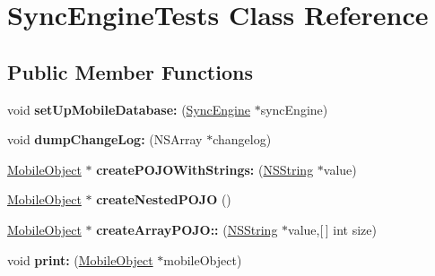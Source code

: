 \hypertarget{interface_sync_engine_tests}{
\section{\-Sync\-Engine\-Tests \-Class \-Reference}
\label{interface_sync_engine_tests}
}
\subsection*{\-Public \-Member \-Functions}
\begin{DoxyCompactItemize}
\item 
\hypertarget{interface_sync_engine_tests_a51a5682df4dec3f02eb3eabaa6e81407}{
void {\bfseries set\-Up\-Mobile\-Database\-:} (\hyperlink{interface_sync_engine}{\-Sync\-Engine} $\ast$sync\-Engine)}
\label{interface_sync_engine_tests_a51a5682df4dec3f02eb3eabaa6e81407}

\item 
\hypertarget{interface_sync_engine_tests_a8237074344a84665f875142288823625}{
void {\bfseries dump\-Change\-Log\-:} (\-N\-S\-Array $\ast$changelog)}
\label{interface_sync_engine_tests_a8237074344a84665f875142288823625}

\item 
\hypertarget{interface_sync_engine_tests_a9e7bb5e016f74b84d45363a75da700d4}{
\hyperlink{interface_mobile_object}{\-Mobile\-Object} $\ast$ {\bfseries create\-P\-O\-J\-O\-With\-Strings\-:} (\hyperlink{class_n_s_string}{\-N\-S\-String} $\ast$value)}
\label{interface_sync_engine_tests_a9e7bb5e016f74b84d45363a75da700d4}

\item 
\hypertarget{interface_sync_engine_tests_addbea0a3f9285bea1e6d1fa3bae38564}{
\hyperlink{interface_mobile_object}{\-Mobile\-Object} $\ast$ {\bfseries create\-Nested\-P\-O\-J\-O} ()}
\label{interface_sync_engine_tests_addbea0a3f9285bea1e6d1fa3bae38564}

\item 
\hypertarget{interface_sync_engine_tests_acd5e4643a66dc9bdbc63f0fde8d03ee1}{
\hyperlink{interface_mobile_object}{\-Mobile\-Object} $\ast$ {\bfseries create\-Array\-P\-O\-J\-O\-::} (\hyperlink{class_n_s_string}{\-N\-S\-String} $\ast$value,\mbox{[}$\,$\mbox{]} int size)}
\label{interface_sync_engine_tests_acd5e4643a66dc9bdbc63f0fde8d03ee1}

\item 
\hypertarget{interface_sync_engine_tests_ab693d11baaf2046066d2c2f91dfaa34b}{
void {\bfseries print\-:} (\hyperlink{interface_mobile_object}{\-Mobile\-Object} $\ast$mobile\-Object)}
\label{interface_sync_engine_tests_ab693d11baaf2046066d2c2f91dfaa34b}


\end{DoxyCompactItemize}
